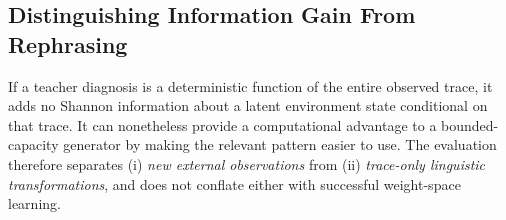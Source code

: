 \subsection{Distinguishing Information Gain From Rephrasing}
If a teacher diagnosis is a deterministic function of the entire
observed trace, it adds no Shannon information about a latent
environment state conditional on that trace. It can nonetheless
provide a computational advantage to a bounded-capacity generator
by making the relevant pattern easier to use. The evaluation
therefore separates (i) \emph{new external observations} from
(ii) \emph{trace-only linguistic transformations}, and does not
conflate either with successful weight-space learning.
